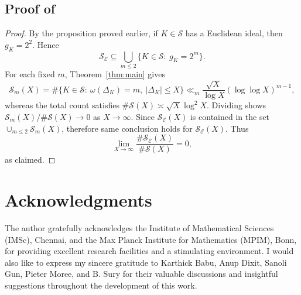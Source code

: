\documentclass[12 pt]{amsart}
\newcommand{\cS}{\mathcal{S}}
\theoremstyle{definition}
\theoremstyle{remark}
\begin{document}
\subsection*{Proof of }
\begin{proof}
	By the proposition proved earlier, if $K\in\mathcal S$ has a Euclidean ideal, then $g_K=2^2$.
	Hence
	\[
	\mathcal S_{\mathcal E}\subseteq \bigcup_{m\le 2}\{K\in\mathcal S:\ g_K=2^m\}.
	\]
	For each fixed $m$,  Theorem~\ref{thm:main} gives
	\[
	\cS_m(X)=\#\{K\in\mathcal S:\ \omega(\Delta_K)=m,\ |\Delta_K|\le X\}
	\ll_m \frac{\sqrt X}{\log X}(\log\log X)^{m-1},
	\]
	whereas the total count satisfies $\#\mathcal S(X)\asymp \sqrt X\log^2 X$.
	Dividing shows $\cS_m(X)/\#\mathcal S(X)\to0$ as $X\to\infty$. Since
	$\mathcal S_{\mathcal E}(X)$ is contained in the  set   $ \cup_{m\leq 2}  \cS_m(X) $, therefore  same conclusion holds for $\mathcal S_{\mathcal E}(X)$.
	Thus
	\[
	\lim_{X\to\infty}\frac{\#\mathcal S_{\mathcal E}(X)}{\#\mathcal S(X)}=0,
	\]
	as claimed.
\end{proof}












\section*{Acknowledgments}

The author gratefully acknowledges the Institute of Mathematical Sciences (IMSc), Chennai, and the Max Planck Institute for Mathematics (MPIM), Bonn, for providing excellent research facilities and a stimulating environment. 
I would also like to express my sincere gratitude to Karthick Babu, Anup Dixit, Sanoli Gun, Pieter Moree, and
 B. Sury for their valuable discussions and insightful suggestions throughout the development of this work.


    	
	
\end{document}
